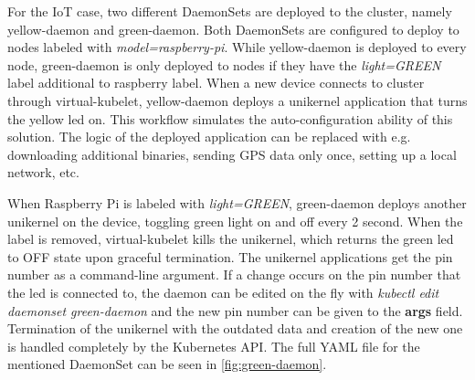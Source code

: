 For the IoT case, two different DaemonSets are deployed to the cluster, namely yellow-daemon and green-daemon. Both DaemonSets are configured to deploy to nodes labeled with \textit{model=raspberry-pi}. While yellow-daemon is deployed to every node, green-daemon is only deployed to nodes if they have the \textit{light=GREEN} label additional to raspberry label. When a new device connects to cluster through virtual-kubelet, yellow-daemon deploys a unikernel application that turns the yellow led on. This workflow simulates the auto-configuration ability of this solution. The logic of the deployed application can be replaced with e.g. downloading additional binaries, sending GPS data only once, setting up a local network, etc.


When Raspberry Pi is labeled with \textit{light=GREEN}, green-daemon deploys another unikernel on the device, toggling green light on and off every 2 second. When the label is removed, virtual-kubelet kills the unikernel, which returns the green led to OFF state upon graceful termination. The unikernel applications get the pin number as a command-line argument. If a change occurs on the pin number that the led is connected to, the daemon can be edited on the fly with \textit{kubectl edit daemonset green-daemon} and the new pin number can be given to the \textbf{args} field. Termination of the unikernel with the outdated data and creation of the new one is handled completely by the Kubernetes API. The full YAML file for the mentioned DaemonSet can be seen in \ref{fig:green-daemon}.




